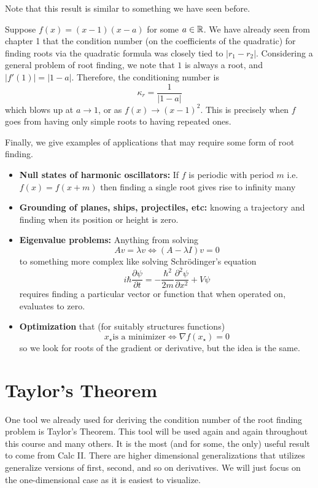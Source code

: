 \documentclass[11pt]{article}
\begin{document}
Note that this result is similar to something we have seen before. 
\begin{example}
Suppose $f(x) = (x-1)(x-a)$ for some $a \in \mathbb{R}$. We have already seen from chapter 1 that the condition number (on the coefficients of the quadratic) for finding roots via the quadratic formula was closely tied to $|r_1-r_2|$. Considering a general problem of root finding, we note that $1$ is always a root, and $|f'(1)| = |1-a|$. Therefore, the conditioning number is $$\kappa_r = \frac{1}{|1-a|}$$ which blows up at $a \to 1$, or as $f(x) \to (x-1)^2$. This is precisely when $f$ goes from having only simple roots to having repeated ones. 


\end{example}
Finally, we give examples of applications that may require some form of root finding.
\begin{itemize}
    \item \textbf{Null states of harmonic oscillators:} If $f$ is periodic with period $m$ i.e. $f(x) = f(x+m)$ then finding a single root gives rise to infinity many
    \item \textbf{Grounding of planes, ships, projectiles, etc:} knowing a trajectory and finding when its position or height is zero.
    \item \textbf{Eigenvalue problems:} Anything from solving $$Av = \lambda v \Longleftrightarrow (A-\lambda I)v = 0$$
    to something more complex like solving Schr\"odinger's equation $$i\hbar \frac{\partial \psi}{\partial t}= -\frac{\hbar^2}{2m}\frac{\partial^2 \psi}{\partial x^2}+V\psi$$
    requires finding a particular vector or function that when operated on, evaluates to zero.
    \item \textbf{Optimization} that (for suitably structures functions) $$x_\star \text{is a minimizer} \Longleftrightarrow \nabla f(x_\star) = 0$$ so we look for roots of the gradient or derivative, but the idea is the same.
\end{itemize}

\section{Taylor's Theorem} One tool we already used for deriving the condition number of the root finding problem is Taylor's Theorem. This tool will be used again and again throughout this course and many others. It is the most (and for some, the only) useful result to come from Calc II. There are higher dimensional generalizations that utilizes generalize versions of first, second, and so on derivatives. We will just focus on the one-dimensional case as it is easiest to visualize.
\end{document}

